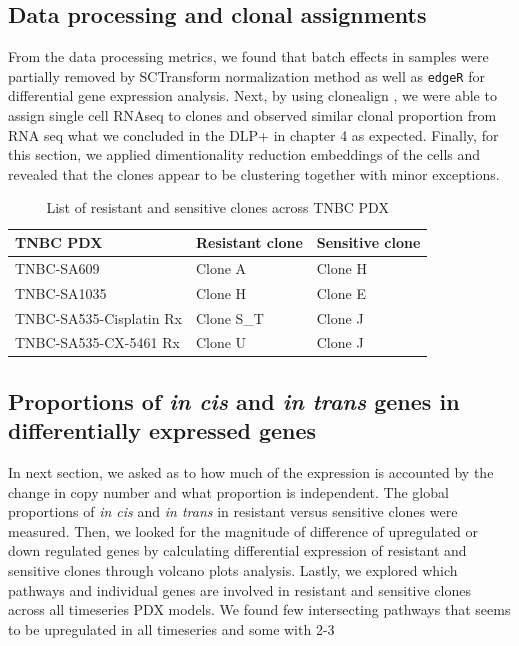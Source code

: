 \subsection{Data processing and clonal assignments}
 From the data processing metrics, we found that batch effects in samples were partially removed by SCTransform normalization method \cite{hafemeister2019normalization} as well as \texttt{edgeR} \cite{robinson2010edger} for differential gene expression analysis.
Next, by using clonealign \cite{campbell2019clonealign}, we were able to assign single cell RNAseq to clones and observed similar clonal proportion from RNA seq what we concluded in the DLP+ in chapter 4 as expected. Finally, for this section,  
we applied dimentionality reduction embeddings of the cells and revealed that the clones appear to be clustering together with minor exceptions. 
 \begin{table}[htbp]
   
   \centering
   \caption{List of resistant and sensitive clones across TNBC PDX}
     \begin{tabular}{|l|l|l|}
      \hline
     TNBC PDX & Resistant clone & Sensitive clone \\
     \hline
     TNBC-SA609  & Clone A & Clone H \\
     TNBC-SA1035 & Clone H & Clone E \\
     TNBC-SA535-Cisplatin Rx & Clone S\_T & Clone J \\
     TNBC-SA535-CX-5461 Rx & Clone U & Clone J \\    \hline
     \end{tabular}%
   \label{tab:Listofresistantandsensitiveclones}%
   
 \end{table}%
 

\subsection{Proportions of \textit{in cis} and \textit{in trans} genes in differentially expressed genes} 
In next section, we asked as to how much of the expression is accounted by the change in copy number and what proportion is independent. The global proportions of \textit{in cis} and \textit{in trans} in resistant versus sensitive clones were measured. Then, we looked for the magnitude of difference of upregulated or down regulated genes by calculating differential expression of resistant and sensitive clones through volcano plots analysis. Lastly, we explored which pathways and individual genes are involved in resistant and sensitive clones across all timeseries PDX models. We found few intersecting pathways that seems to be upregulated in all timeseries and some with 2-3

